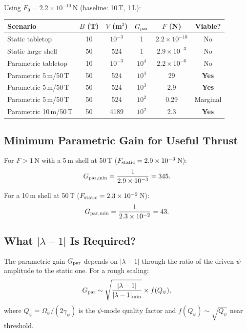 \documentclass[11pt]{article}
\begin{document}
Using $F_0 = 2.2 \times 10^{-10}$\,N (baseline: 10\,T, 1\,L):

\begin{center}
\begin{tabular}{lccccc}
\toprule
Scenario & $B$ (T) & $V$ (m$^3$) & $G_{\rm par}$ & $F$ (N) & Viable? \\
\midrule
Static tabletop & 10 & $10^{-3}$ & 1 & $2.2 \times 10^{-10}$ & No \\
Static large shell & 50 & 524 & 1 & $2.9 \times 10^{-3}$ & No \\
Parametric tabletop & 10 & $10^{-3}$ & $10^4$ & $2.2 \times 10^{-6}$ & No \\
Parametric 5\,m/50\,T & 50 & 524 & $10^4$ & 29 & \textbf{Yes} \\
Parametric 5\,m/50\,T & 50 & 524 & $10^3$ & 2.9 & \textbf{Yes} \\
Parametric 5\,m/50\,T & 50 & 524 & $10^2$ & 0.29 & Marginal \\
Parametric 10\,m/50\,T & 50 & 4189 & $10^2$ & 2.3 & \textbf{Yes} \\
\bottomrule
\end{tabular}
\end{center}

\subsection{Minimum Parametric Gain for Useful Thrust}

For $F > 1$\,N with a 5\,m shell at 50\,T ($F_{\rm static} = 2.9 \times 10^{-3}$\,N):
\begin{equation}
G_{\rm par,min} = \frac{1}{2.9 \times 10^{-3}} = 345.
\end{equation}

For a 10\,m shell at 50\,T ($F_{\rm static} = 2.3 \times 10^{-2}$\,N):
\begin{equation}
G_{\rm par,min} = \frac{1}{2.3 \times 10^{-2}} = 43.
\end{equation}

\subsection{What $|\lambda - 1|$ Is Required?}

The parametric gain $G_{\rm par}$ depends on $|\lambda - 1|$ through the
ratio of the driven $\psi$-amplitude to the static one. For a rough
scaling:
\begin{equation}
G_{\rm par} \sim \sqrt{\frac{|\lambda - 1|}{|\lambda - 1|_{\rm min}}}
  \times f(Q_\psi),
\end{equation}
where $Q_\psi = \Omega_\psi/(2\gamma_\psi)$ is the $\psi$-mode quality
factor and $f(Q_\psi) \sim \sqrt{Q_\psi}$ near threshold.
\end{document}

